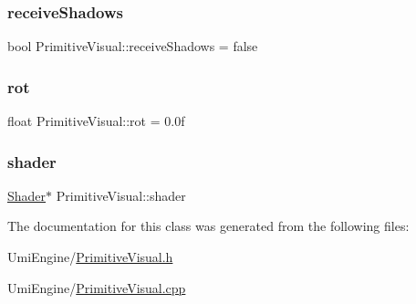 \mbox{\label{class_primitive_visual_ab3f6291a1a2914f0403ae118f8d9d8e5}} 
\subsubsection{\texorpdfstring{receiveShadows}{receiveShadows}}
{\footnotesize\ttfamily bool Primitive\+Visual\+::receive\+Shadows = false}

\mbox{\label{class_primitive_visual_ae1cf9c3c3df2513f00cda8d788404bec}} 
\subsubsection{\texorpdfstring{rot}{rot}}
{\footnotesize\ttfamily float Primitive\+Visual\+::rot = 0.\+0f}

\mbox{\label{class_primitive_visual_a463e83ee34d0727a19cf417f74ea67e7}} 
\subsubsection{\texorpdfstring{shader}{shader}}
{\footnotesize\ttfamily \mbox{\hyperlink{class_shader}{Shader}}$\ast$ Primitive\+Visual\+::shader}



The documentation for this class was generated from the following files\+:\begin{DoxyCompactItemize}
\item 
Umi\+Engine/\mbox{\hyperlink{_primitive_visual_8h}{Primitive\+Visual.\+h}}\item 
Umi\+Engine/\mbox{\hyperlink{_primitive_visual_8cpp}{Primitive\+Visual.\+cpp}}\end{DoxyCompactItemize}
